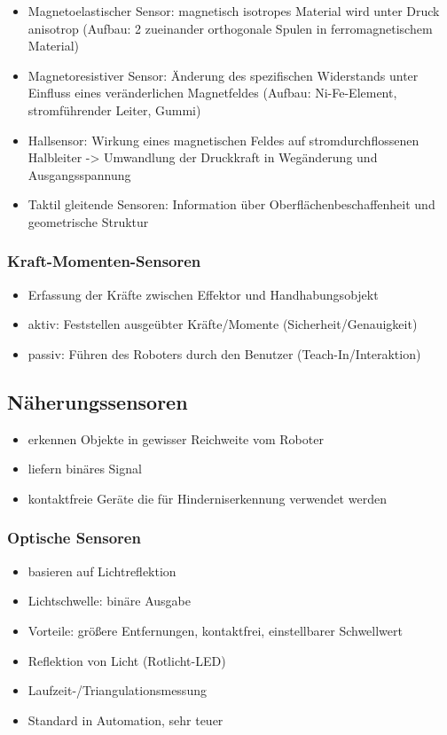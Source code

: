 \documentclass[paper=a4, fontsize=11pt]{scrartcl} %
\numberwithin{equation}{section} %
\numberwithin{figure}{section} %
\numberwithin{table}{section} %
\begin{document}
\begin{itemize}
\item Magnetoelastischer Sensor: magnetisch isotropes Material wird unter Druck anisotrop (Aufbau: 2 zueinander orthogonale Spulen in ferromagnetischem Material)
\item Magnetoresistiver Sensor: Änderung des spezifischen Widerstands unter Einfluss eines veränderlichen Magnetfeldes (Aufbau: Ni-Fe-Element, stromführender Leiter, Gummi)
\item Hallsensor: Wirkung eines magnetischen Feldes auf stromdurchflossenen Halbleiter -> Umwandlung der Druckkraft in Wegänderung und Ausgangsspannung
\item Taktil gleitende Sensoren: Information über Oberflächenbeschaffenheit und geometrische Struktur
\end{itemize}

\subsubsection{Kraft-Momenten-Sensoren}

\begin{itemize}
\item Erfassung der Kräfte zwischen Effektor und Handhabungsobjekt
\item aktiv: Feststellen ausgeübter Kräfte/Momente (Sicherheit/Genauigkeit)
\item passiv: Führen des Roboters durch den Benutzer (Teach-In/Interaktion)
\end{itemize}

\subsection{Näherungssensoren}

\begin{itemize}
\item erkennen Objekte in gewisser Reichweite vom Roboter
\item liefern binäres Signal
\item kontaktfreie Geräte die für Hinderniserkennung verwendet werden
\end{itemize}

\subsubsection{Optische Sensoren}

\begin{itemize}
\item basieren auf Lichtreflektion
\item Lichtschwelle: binäre Ausgabe
\item Vorteile: größere Entfernungen, kontaktfrei, einstellbarer Schwellwert
\item Reflektion von Licht (Rotlicht-LED)
\item Laufzeit-/Triangulationsmessung
\item Standard in Automation, sehr teuer
\end{itemize}
\end{document}
